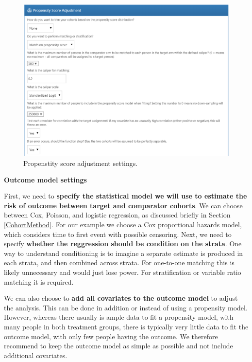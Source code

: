 \documentclass[]{book}
\begin{document}
\begin{figure}

{\centering \includegraphics[width=1\linewidth]{images/PopulationLevelEstimation/psSettings} 

}

\caption{Propenstity score adjustment settings.}\label{fig:psSettings}
\end{figure}

\textbf{Outcome model settings}

First, we need to \textbf{specify the statistical model we will use to
estimate the risk of outcome between target and comparator cohorts}. We
can choose between Cox, Poisson, and logistic regression, as discussed
briefly in Section \ref{CohortMethod}. For our example we choose a Cox
proportional hazards model, which considers time to first event with
possible censoring. Next, we need to specify \textbf{whether the
reggression should be condition on the strata}. One way to understand
conditioning is to imagine a separate estimate is produced in each
strata, and then combined across strata. For one-to-one matching this is
likely unnecessary and would just lose power. For stratification or
variable ratio matching it is required.

We can also choose to \textbf{add all covariates to the outcome model}
to adjust the analysis. This can be done in addition or instead of using
a propensity model. However, whereas there usually is ample data to fit
a propensity model, with many people in both treatment groups, there is
typically very little data to fit the outcome model, with only few
people having the outcome. We therefore recommend to keep the outcome
model as simple as possible and not include additional covariates.
\end{document}
